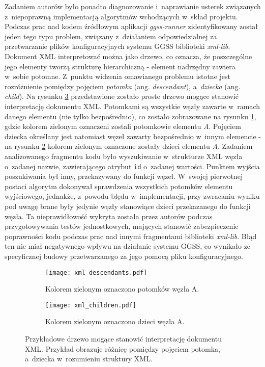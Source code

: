 Zadaniem autorów było ponadto diagnozowanie i~naprawianie usterek związanych z~niepoprawną implementacją algorytmów wchodzących w~skład projektu. Podczas prac nad kodem źródłowym aplikacji \emph{ggss-runner} zidentyfikowany został jeden tego typu problem, związany z~działaniem odpowiedzialnej za przetwarzanie plików konfiguracyjnych systemu GGSS biblioteki \emph{xml-lib}. Dokument XML interpretować można jako drzewo, co oznacza, że poszczególne jego elementy tworzą strukturę hierarchiczną - element nadrzędny zawiera w~sobie potomne. Z~punktu widzenia omawianego problemu istotne jest rozróżnienie pomiędzy pojęciem \emph{potomka} (ang. \emph{descendant}), a~\emph{dziecka} (ang. \emph{child}). Na rysunku \ref{fig:xml_example} przedstawione zostało proste drzewo mogące stanowić interpretację dokumentu XML. Potomkami są wszystkie węzły zawarte w~ramach danego elementu (nie tylko bezpośrednio), co zostało zobrazowane na rysunku \ref{fig:xml_descendant}, gdzie kolorem zielonym oznaczeni zostali potomkowie elementu \emph{A}. Pojęciem dziecka określany jest natomiast węzeł zawarty bezpośrednio w~innym elemencie - na rysunku \ref{fig:xml:children} kolorem zielonym oznaczone zostały dzieci elementu \emph{A}. Zadaniem analizowanego fragmentu kodu było wyszukiwanie w~strukturze XML węzła o~zadanej nazwie, zawierającego atrybut \lstinline{id} o~zadanej wartości. Punktem wyjścia poszukiwania był inny, przekazywany do funkcji węzeł. W~swojej pierwotnej postaci algorytm dokonywał sprawdzenia wszystkich potomków elementu wyjściowego, jednakże, z~powodu błędu w~implementacji, przy zwracaniu wyniku pod uwagę brane były jedynie węzły stanowiące dzieci przekazanego do funkcji węzła. Ta nieprawidłowość wykryta została przez autorów podczas przygotowywania testów jednostkowych, mających stanowić zabezpieczenie poprawności kodu podczas prac nad innymi fragmentami biblioteki \emph{xml-lib}. Błąd ten nie miał negatywnego wpływu na działanie systemu GGSS, co wynikało ze specyficznej budowy przetwarzanego za jego pomocą pliku konfiguracyjnego. 

\begin{figure}[H]
\centering

\begin{subfigure}{0.48\textwidth}
\centering
\texttt{[image: xml\_descendants.pdf]}
\caption{Kolorem zielonym oznaczono potomków węzła A.}
\label{fig:xml_descendant}
\end{subfigure}
\begin{subfigure}{0.48\textwidth}
\centering
\texttt{[image: xml\_children.pdf]}
\caption{Kolorem zielonym oznaczono dzieci węzła A.}
\label{fig:xml:children}
\end{subfigure}

\caption{Przykładowe drzewo mogące stanowić interpretację dokumentu XML. Przykład obrazuje różnicę pomiędzy pojęciem potomka, a~dziecka w~rozumieniu struktury XML. }
\label{fig:xml_example}
\end{figure}

